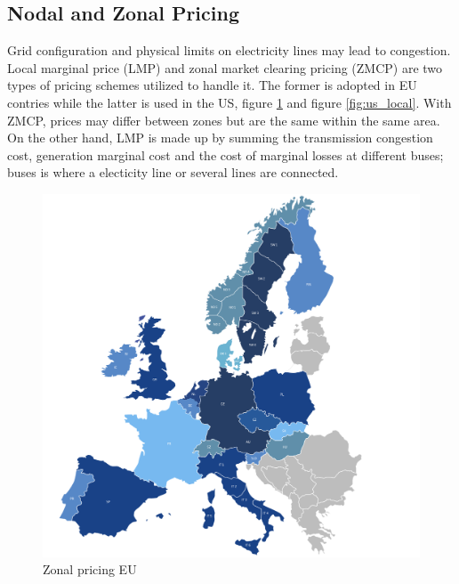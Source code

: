 \subsection{Nodal and Zonal Pricing}
Grid configuration and physical limits on electricity lines may lead to congestion. Local marginal price (LMP) and zonal market clearing pricing (ZMCP) are two types of pricing schemes utilized to handle it. The former is adopted in EU contries while the latter is used in the US, figure \ref{fig:eu_zonal} and figure \ref{fig:us_local}.
With ZMCP, prices may differ between zones but are the same within the same area.
On the other hand, LMP is made up by summing the transmission congestion cost, generation marginal cost and the cost of marginal losses at different buses; buses is where a electicity line or several lines are connected.
\begin{figure}[!h]
    \includegraphics[width=\textwidth]{images/eu_zonal.png}
    \caption{Zonal pricing EU \cite{eu_zonal}}
    \label{fig:eu_zonal}
\end{figure}

